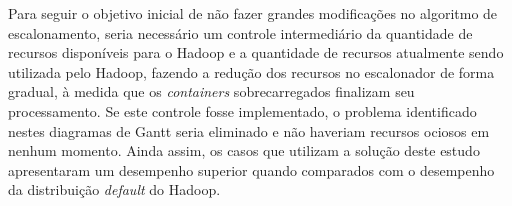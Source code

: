 Para seguir o objetivo inicial de não fazer grandes modificações no algoritmo de escalonamento, seria necessário um controle intermediário da quantidade de recursos disponíveis para o Hadoop e a quantidade de recursos atualmente sendo utilizada pelo Hadoop, fazendo a redução dos recursos no escalonador de forma gradual, à medida que os \textit{containers} sobrecarregados finalizam seu processamento. Se este controle fosse implementado, o problema identificado nestes diagramas de Gantt seria eliminado e não haveriam recursos ociosos em nenhum momento. Ainda assim, os casos que utilizam a solução deste estudo apresentaram um desempenho superior quando comparados com o desempenho da distribuição \textit{default} do Hadoop.


%
%
